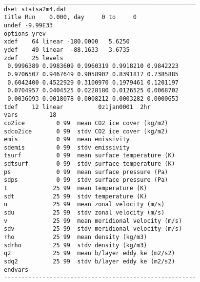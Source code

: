 \begin{verbatim}
_______________________________________________________
dset statsa2m4.dat
title Run    0.000, day     0 to     0
undef -9.99E33
options yrev
xdef    64 linear -180.0000   5.6250
ydef    49 linear  -88.1633   3.6735
zdef    25 levels
 0.9996389 0.9983609 0.9960319 0.9918210 0.9842223
 0.9706507 0.9467649 0.9058902 0.8391817 0.7385885
 0.6042400 0.4522929 0.3100970 0.1979461 0.1201197
 0.0704957 0.0404525 0.0228180 0.0126525 0.0068702
 0.0036093 0.0018078 0.0008212 0.0003282 0.0000653
tdef    12 linear          0z1jan0001  2hr
vars         18
co2ice         0 99  mean CO2 ice cover (kg/m2)
sdco2ice       0 99  stdv CO2 ice cover (kg/m2)
emis           0 99  mean emissivity
sdemis         0 99  stdv emissivity
tsurf          0 99  mean surface temperature (K)
sdtsurf        0 99  stdv surface temperature (K)
ps             0 99  mean surface pressure (Pa)
sdps           0 99  stdv surface pressure (Pa)
t             25 99  mean temperature (K)
sdt           25 99  stdv temperature (K)
u             25 99  mean zonal velocity (m/s)
sdu           25 99  stdv zonal velocity (m/s)
v             25 99  mean meridional velocity (m/s)
sdv           25 99  stdv meridional velocity (m/s)
rho           25 99  mean density (kg/m3)
sdrho         25 99  stdv density (kg/m3)
q2            25 99  mean b/layer eddy ke (m2/s2)
sdq2          25 99  stdv b/layer eddy ke (m2/s2)
endvars
-------------------------------------------------------
\end{verbatim}
